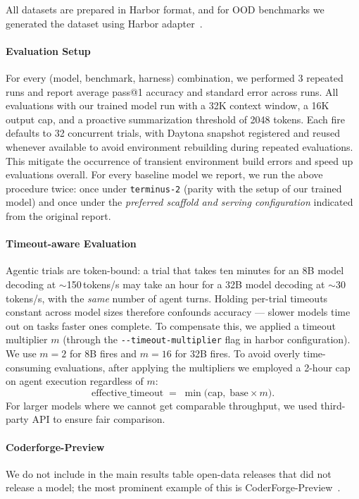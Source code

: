 \documentclass{article}
\begin{document}
All datasets are prepared in Harbor format, and for OOD benchmarks we generated the dataset using Harbor adapter~\citep{Harbor_Framework}.

\paragraph{Evaluation Setup} 
\label{app:eval-setup}
For every (model, benchmark, harness) combination, we performed 3 repeated runs and report average pass@1 accuracy and standard error across runs. All evaluations with our trained model run with a 32K context window, a 16K output cap, and a proactive summarization threshold of 2048 tokens. Each fire defaults to 32 concurrent trials, with Daytona snapshot registered and reused whenever available to avoid environment rebuilding during repeated evaluations. This mitigate the occurrence of transient environment build errors and speed up evaluations overall. For every baseline model we report, we run the above procedure twice: once under \texttt{terminus-2} (parity with the setup of our trained model) and once under the \emph{preferred scaffold and serving configuration} indicated from the original report. 

\paragraph{Timeout-aware Evaluation}
\label{app:eval-time}
Agentic trials are token-bound: a trial that takes
ten minutes for an 8B model decoding at $\sim$150\,tokens/s may take
an hour for a 32B model decoding at $\sim$30\,tokens/s, with the
\emph{same} number of agent turns. Holding per-trial timeouts
constant across model sizes therefore confounds accuracy --- slower
models time out on tasks faster ones complete. To compensate this, we applied a timeout multiplier $m$ (through the \texttt{-{}-timeout-multiplier} flag in harbor configuration).
We use $m = 2$ for 8B fires and $m = 16$ for 32B fires. To avoid overly time-consuming evaluations, after applying the multipliers we employed a 2-hour cap on agent execution regardless of $m$:
\[
  \text{effective\_timeout}
  \;=\; \min\!\big(\text{cap},\; \text{base} \times m\big).
\]
For larger models where we cannot get comparable throughput, we used third-party API to ensure fair comparison. 

\paragraph{Coderforge-Preview}We do not include in the main results table open-data releases that did not release a model; the most prominent example of this is CoderForge-Preview~\citep{CoderForge2026}.
\end{document}
